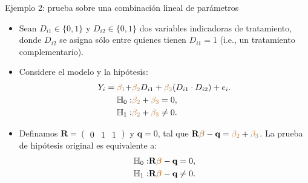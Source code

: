 \documentclass[10pt, xcolor=dvipsnames]{beamer}
\begin{document}
\begin{frame}{Ejemplo 2: prueba sobre una combinación lineal de parámetros}
\begin{itemize}
    \item Sean \(D_{i1} \in \{0,1\}\) y \(D_{i2} \in \{0,1\}\) dos variables indicadoras de tratamiento, donde \(D_{i2}\) se asigna sólo entre quienes tienen \(D_{i1}=1\) (i.e., un tratamiento complementario). %
    \smallspace
    \item Considere el modelo y la hipótesis:
    \begin{align*}
    \begin{split}
        Y_i = \textcolor{brown}{\beta_1} + &\textcolor{brown}{\beta_2} D_{i1} + \textcolor{brown}{\beta_3} (D_{i1} \cdot D_{i2}) + e_i. \\
        \textcolor{black}{\mathbb{H}_{0}}:& \textcolor{brown}{\beta_2} + \textcolor{brown}{\beta_3} = 0,  \\
        \textcolor{black}{\mathbb{H}_{1}}:& \textcolor{brown}{\beta_2} + \textcolor{brown}{\beta_3} \neq 0.
    \end{split}
    \end{align*}  
    \item Definamos $\textbf{R} = \begin{pmatrix} 0 & 1 & 1 \end{pmatrix}$ y $\textbf{q}=0$, tal que \(\textbf{R}\textcolor{brown}{\boldsymbol{\beta}} - \textbf{q} = \textcolor{brown}{\beta_2} + \textcolor{brown}{\beta_3}\). La prueba de hipótesis original es equivalente a:
    \vspace{-0.0em}
    \begin{align*}
    \begin{split}
    \textcolor{black}{\mathbb{H}_{0}}:& \textbf{R}\textcolor{brown}{\boldsymbol{\beta}} - \textbf{q} = 0, \\
    \textcolor{black}{\mathbb{H}_{1}}:& \textbf{R}\textcolor{brown}{\boldsymbol{\beta}} - \textbf{q} \neq 0.
    \end{split}
    \end{align*}
\end{itemize}
\end{frame}
\end{document}
